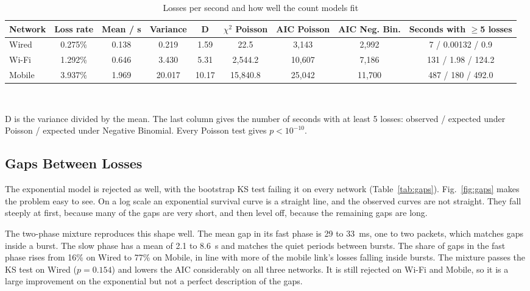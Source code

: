 \documentclass[conference]{IEEEtran}
\begin{document}
\begin{table}[!t]
\caption{Losses per second and how well the count models fit}
\label{tab:counts}
\centering
\footnotesize
\setlength{\tabcolsep}{6pt}
\begin{tabular}{lcccccccc}
\toprule
Network & Loss rate & Mean / s & Variance & D & $\chi^2$ Poisson & AIC Poisson & AIC Neg. Bin. & Seconds with $\ge$5 losses \\
\midrule
Wired & 0.275\% & 0.138 & 0.219 & 1.59 & 22.5 & 3{,}143 & 2{,}992 & 7 / 0.00132 / 0.9 \\
Wi-Fi & 1.292\% & 0.646 & 3.430 & 5.31 & 2{,}544.2 & 10{,}607 & 7{,}186 & 131 / 1.98 / 124.2 \\
Mobile & 3.937\% & 1.969 & 20.017 & 10.17 & 15{,}840.8 & 25{,}042 & 11{,}700 & 487 / 180 / 492.0 \\
\bottomrule
\end{tabular}
\\[2pt]
\raggedright\scriptsize D is the variance divided by the mean. The last column gives the number of seconds with at least 5 losses: observed / expected under Poisson / expected under Negative Binomial. Every Poisson test gives $p<10^{-10}$.
\end{table}

\subsection{Gaps Between Losses}
The exponential model is rejected as well, with the bootstrap KS test failing it on every network (Table~\ref{tab:gaps}). Fig.~\ref{fig:gaps} makes the problem easy to see. On a log scale an exponential survival curve is a straight line, and the observed curves are not straight. They fall steeply at first, because many of the gaps are very short, and then level off, because the remaining gaps are long.

The two-phase mixture reproduces this shape well. The mean gap in its fast phase is 29 to 33~ms, one to two packets, which matches gaps inside a burst. The slow phase has a mean of 2.1 to 8.6~s and matches the quiet periods between bursts. The share of gaps in the fast phase rises from 16\% on Wired to 77\% on Mobile, in line with more of the mobile link's losses falling inside bursts. The mixture passes the KS test on Wired ($p=0.154$) and lowers the AIC considerably on all three networks. It is still rejected on Wi-Fi and Mobile, so it is a large improvement on the exponential but not a perfect description of the gaps.
\end{document}
